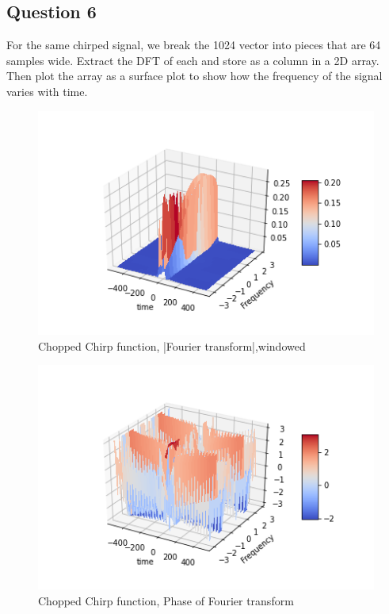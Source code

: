 \documentclass[11pt, a4paper]{article}
\begin{document}
\subsection{Question 6}
For the same chirped signal, we break the 1024 vector into pieces that are 64 samples wide.
Extract the DFT of each and store as a column in a 2D array. Then plot the array as a surface plot to show how the frequency of the signal varies with time.


\begin{figure}[h!]
\centering
\includegraphics[scale=0.7]{fig7.png}
\caption{Chopped Chirp function, |Fourier transform|,windowed}
\label{fig:universe}
\end{figure}

\begin{figure}[h!]
\centering
\includegraphics[scale=0.7]{fig8.png}
\caption{Chopped Chirp function, Phase of Fourier transform}
\label{fig:universe}
\end{figure}

\newpage
\end{document}
